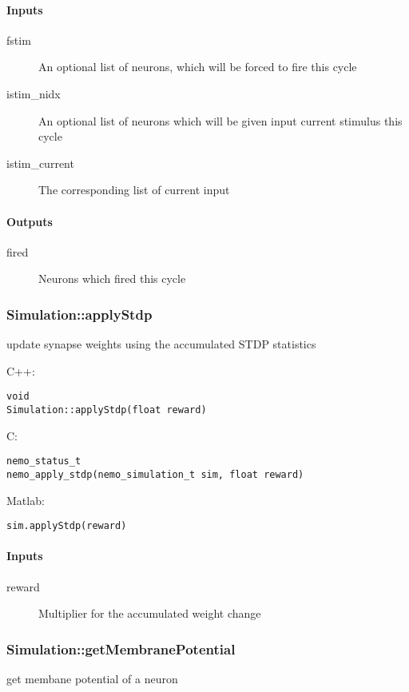 \paragraph{Inputs}
\begin{description}
\item[fstim] An optional list of neurons, which will be forced to fire this cycle
\item[istim\_nidx] An optional list of neurons which will be given input current stimulus this cycle
\item[istim\_current] The corresponding list of current input
\end{description}
\paragraph{Outputs}
\begin{description}
\item[fired] Neurons which fired this cycle
\end{description}

\clearpage
\subsubsection*{Simulation::applyStdp}
\label{fn: applyStdp}
update synapse weights using the accumulated STDP statistics


\noindent C++:
\begin{lstlisting}[aboveskip=2pt]
void
Simulation::applyStdp(float reward)
\end{lstlisting}

\noindent C:
\begin{lstlisting}[aboveskip=2pt]
nemo_status_t
nemo_apply_stdp(nemo_simulation_t sim, float reward)
\end{lstlisting}

\noindent Matlab:
\begin{lstlisting}[aboveskip=2pt]
sim.applyStdp(reward)
\end{lstlisting}
\paragraph{Inputs}
\begin{description}
\item[reward] Multiplier for the accumulated weight change
\end{description}

\clearpage
\subsubsection*{Simulation::getMembranePotential}
\label{fn: getMembranePotential}
get membane potential of a neuron


